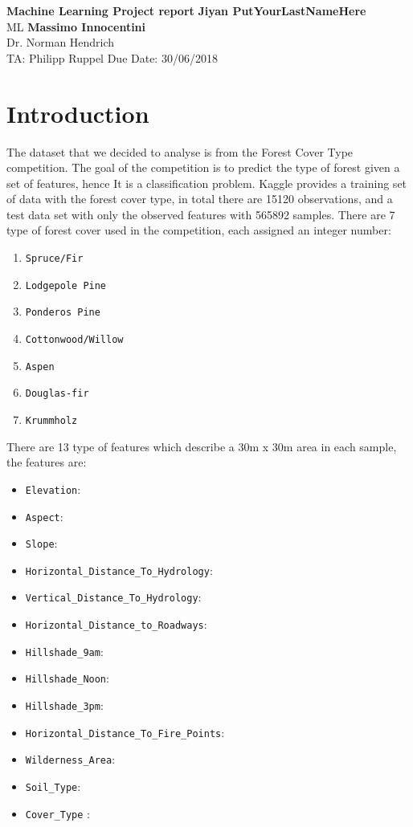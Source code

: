 \documentclass[a4paper, 11pt]{article}
\begin{document}
\noindent
\large\textbf{Machine Learning Project report} \hfill \textbf{Jiyan PutYourLastNameHere} \\
\normalsize ML \hfill \textbf{Massimo Innocentini} \\
Dr. Norman Hendrich \\
TA: Philipp Ruppel \hfill Due Date: 30/06/2018

\section*{Introduction}
The dataset that we decided to analyse is from the Forest Cover Type competition. The goal of the competition is to predict the type of forest given a set of features, hence It is a classification problem. Kaggle provides a training set of data with the forest cover type, in total there are 15120 observations, and a test data set with only the observed features with 565892 samples. There are 7 type of forest cover used in the competition, each assigned an integer number: 

\begin{enumerate}
  \item \texttt{Spruce/Fir}
  \item \texttt{Lodgepole Pine}
  \item \texttt{Ponderos Pine}
  \item \texttt{Cottonwood/Willow}
  \item \texttt{Aspen}
  \item \texttt{Douglas-fir}
  \item \texttt{Krummholz}
\end{enumerate}

There are 13 type of features which describe a 30m x 30m area in each sample, the features are:

\begin{itemize}
  \item \texttt{Elevation}: 
  \item \texttt{Aspect}: 
  \item \texttt{Slope}: 
  \item \texttt{Horizontal\_Distance\_To\_Hydrology}: 
  \item \texttt{Vertical\_Distance\_To\_Hydrology}: 
  \item \texttt{Horizontal\_Distance\_to\_Roadways}: 
  \item \texttt{Hillshade\_9am}: 
  \item \texttt{Hillshade\_Noon}:
  \item \texttt{Hillshade\_3pm}:
  \item \texttt{Horizontal\_Distance\_To\_Fire\_Points}: 
  \item \texttt{Wilderness\_Area}: 
  \item \texttt{Soil\_Type}: 
  \item \texttt{Cover\_Type} :
\end{itemize} 
\end{document}
